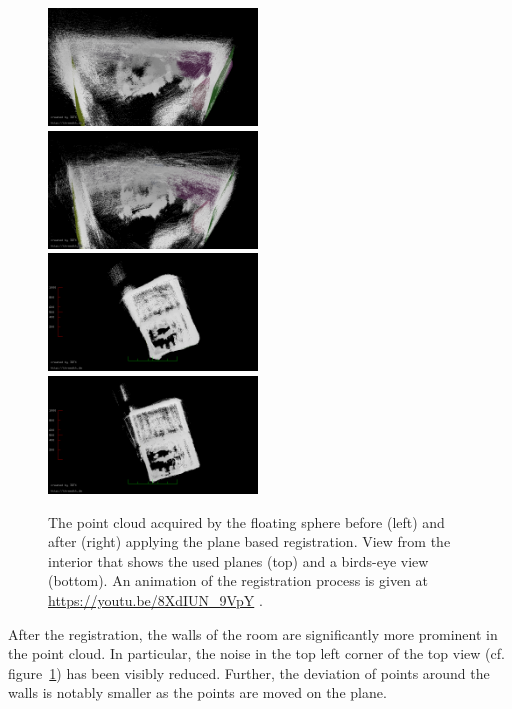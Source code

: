 \begin{figure}
	\centering
	\includegraphics[width=0.495\textwidth]{./images/cylon_uncorr_corner}\hfill
	\includegraphics[width=0.495\textwidth]{./images/cylon_corr_corner}\\
	\includegraphics[width=0.495\textwidth]{./images/cylon_uncorr_top}\hfill
	\includegraphics[width=0.495\textwidth]{./images/cylon_corr_top}
	\caption{The point cloud acquired by the floating sphere before (left) and after (right) applying the plane based registration. View from the interior that shows the used planes (top) and a birds-eye view (bottom). An animation of the registration process is given at \url{https://youtu.be/8XdIUN_9VpY} .}
	\label{fig:cylon-corrected}
\end{figure}
After the registration, the walls of the room are significantly more prominent in the point cloud. 
In particular, the noise in the top left corner of the top view (cf. figure~\ref{fig:cylon-corrected}) has been visibly reduced.
Further, the deviation of points around the walls is notably smaller as the points are moved on the plane.


